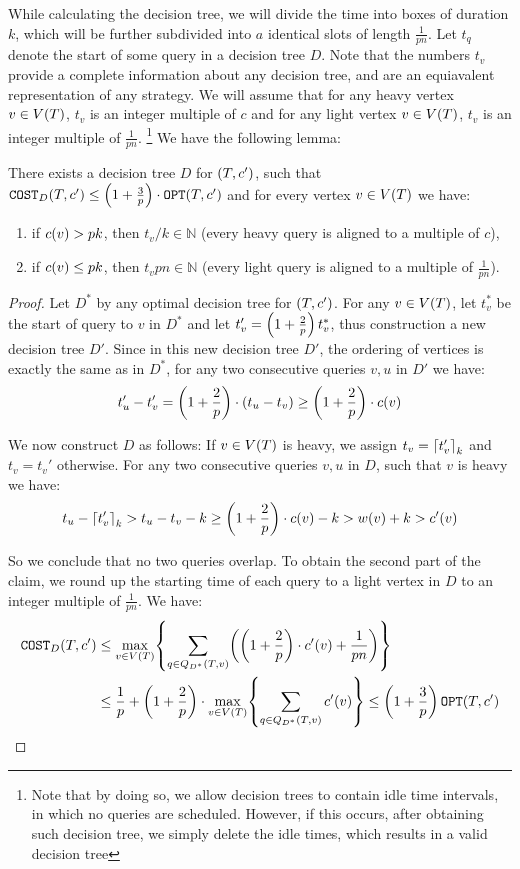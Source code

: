 While calculating the decision tree, we will divide the time into boxes of duration $k$, which will be further subdivided into $a$ identical slots of length $\frac{1}{pn}$. Let $t_q$ denote the start of some query in a decision tree $D$. Note that the numbers $t_v$ provide a complete information about any decision tree, and are an equiavalent representation of any strategy. We will assume that for any heavy vertex $v\in V\mathopen{}\left( T \right)$, $t_v$ is an integer multiple of $c$ and for any light vertex $v\in V\mathopen{}\left( T \right)$, $t_v$ is an integer multiple of $\frac{1}{pn}$. \footnote{Note that by doing so, we allow decision trees to contain idle time intervals, in which no queries are scheduled. However, if this occurs, after obtaining such decision tree, we simply delete the idle times, which results in a valid decision tree} We have the following lemma:
\begin{lemma}\label{aligned_dts_lemma}
    There exists a decision tree $D$ for $\mathopen{}\left( T,c' \right)$, such that $\texttt{COST}_{D}\mathopen{}\left( T, c' \right)\leq \mathopen{}\left( 1+\frac{3}{p} \right)\cdot\texttt{OPT}\mathopen{}\left( T, c' \right)$ and for every vertex $v\in V\mathopen{}\left( T \right)$ we have:
    \begin{enumerate}
        \item if $c\mathopen{}\left( v \right)> pk$, then $t_v/k\in\mathbb{N}$ (every heavy query is aligned to a multiple of $c$),
        \item if $c\mathopen{}\left( v \right)\leq pk$, then $t_vpn\in\mathbb{N}$ (every light query is aligned to a multiple of $\frac{1}{pn}$).
    \end{enumerate}
    \begin{proof}
        Let $D^*$ by any optimal decision tree for $\mathopen{}\left( T,c' \right)$. For any $v\in V\mathopen{}\left( T \right)$, let $t_v^*$ be the start of query to $v$ in $D^*$ and let $t_v'=\mathopen{}\left( 1+\frac{2}{p} \right)t_v^*$, thus construction a new decision tree $D'$. Since in this new decision tree $D'$, the ordering of vertices is exactly the same as in $D^*$, for any two consecutive queries $v,u$ in $D'$ we have:
        $$
            t_u'-t_v'=\mathopen{}\left( 1+\frac{2}{p} \right)\cdot\mathopen{}\left( t_u-t_v \right)\geq \mathopen{}\left( 1+\frac{2}{p} \right)\cdot c\mathopen{}\left( v \right)
        $$

        We now construct $D$ as follows: If $v\in V\mathopen{}\left( T \right)$ is heavy, we assign $t_v=\mathopen{}\left\lceil t_v' \right\rceil_k$ and $t_v=t_v'$ otherwise. For any two consecutive queries $v,u$ in $D$, such that $v$ is heavy we have:
        $$
        t_u-\mathopen{}\left\lceil t_v' \right\rceil_k>t_u-t_v-k\geq \mathopen{}\left( 1+\frac{2}{p} \right)\cdot c\mathopen{}\left( v \right)-k>w\mathopen{}\left( v \right)+k>c'\mathopen{}\left( v \right)
        $$

        So we conclude that no two queries overlap. To obtain the second part of the claim, we round up the starting time of each query to a light vertex in $D$ to an integer multiple of $\frac{1}{pn}$. We have:
        \begin{align*}
            \texttt{COST}_{D}\mathopen{}\left( T,c' \right)&
            \leq \max_{v\in V\mathopen{}\left( T \right)}\mathopen{}\left\{ \sum_{q\in Q_{D^*}\mathopen{}\left( T,v \right)}\mathopen{}\left( \mathopen{}\left( 1+\frac{2}{p} \right)\cdot c'\mathopen{}\left( v \right)+\frac{1}{pn} \right) \right\}
            \\&
            \leq \frac{1}{p}+\mathopen{}\left( 1+\frac{2}{p} \right)\cdot \max_{v\in V\mathopen{}\left( T \right)}\mathopen{}\left\{ \sum_{q\in Q_{D^*}\mathopen{}\left( T,v \right)}c'\mathopen{}\left( v \right)  \right\}\leq \mathopen{}\left( 1+\frac{3}{p} \right)\texttt{OPT}\mathopen{}\left( T,c' \right)
        \end{align*}


\end{proof}
\end{lemma}
